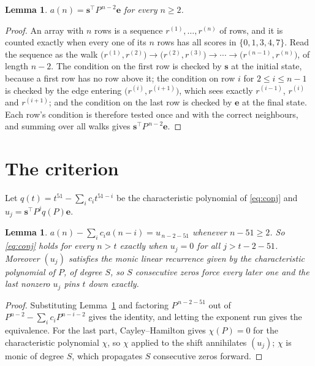 \documentclass[11pt,a4paper]{article}
\theoremstyle{plain}
\newtheorem{lemma}[theorem]{Lemma}
\theoremstyle{definition}
\begin{document}
\begin{lemma}\label{lem:walk}
$a(n)=\mathbf{s}^{\!\top}P^{\,n-2}\mathbf{e}$ for every $n\ge2$.
\end{lemma}

\begin{proof}
An array with $n$ rows is a sequence $r^{(1)},\dots,r^{(n)}$ of rows, and it is counted
exactly when every one of its $n$ rows has all scores in $\{0,1,3,4,7\}$. Read the sequence as the
walk $\bigl(r^{(1)},r^{(2)}\bigr)\to\bigl(r^{(2)},r^{(3)}\bigr)\to\cdots\to
\bigl(r^{(n-1)},r^{(n)}\bigr)$, of length $n-2$. The condition on the first row is
checked by $\mathbf{s}$ at the initial state, because a first row has no row above it; the
condition on row $i$ for $2\le i\le n-1$ is checked by the edge entering
$\bigl(r^{(i)},r^{(i+1)}\bigr)$, which sees exactly $r^{(i-1)}$, $r^{(i)}$ and
$r^{(i+1)}$; and the condition on the last row is checked by $\mathbf{e}$ at the final
state. Each row's condition is therefore tested once and with the correct neighbours, and
summing over all walks gives $\mathbf{s}^{\!\top}P^{\,n-2}\mathbf{e}$.
\end{proof}

\section{The criterion}

Let $q(t)=t^{51}-\sum_i c_i t^{51-i}$ be the characteristic polynomial of
\eqref{eq:conj} and $u_j=\mathbf{s}^{\!\top}P^{j}q(P)\mathbf{e}$.

\begin{lemma}\label{lem:crit}
$a(n)-\sum_i c_i a(n-i)=u_{\,n-2-51}$ whenever $n-51\ge2$. So \eqref{eq:conj}
holds for every $n>t$ exactly when $u_j=0$ for all $j>t-2-51$. Moreover $(u_j)$
satisfies the monic linear recurrence given by the characteristic polynomial of $P$, of
degree $S$, so $S$ consecutive zeros force every later one and the last nonzero $u_j$ pins
$t$ down exactly.
\end{lemma}

\begin{proof}
Substituting Lemma~\ref{lem:walk} and factoring $P^{\,n-2-51}$ out of
$P^{n-2}-\sum_i c_i P^{n-i-2}$ gives the identity, and letting the exponent run gives the
equivalence. For the last part, Cayley--Hamilton gives $\chi(P)=0$ for the characteristic
polynomial $\chi$, so $\chi$ applied to the shift annihilates $(u_j)$; $\chi$ is monic of
degree $S$, which propagates $S$ consecutive zeros forward.
\end{proof}
\end{document}

